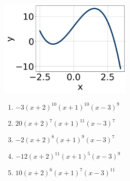 \documentclass[14pt]{extbook}
\begin{document}
\begin{enumerate}
{\begin{center}
    \includegraphics[width=0.5\textwidth]{../Figures/polyGraphToFunctionCopyA.png}
\end{center}
\begin{enumerate}[label=\Alph*.]
\item \( -3(x + 2)^{10} (x + 1)^{10} (x - 3)^{9} \)
\item \( 20(x + 2)^{7} (x + 1)^{11} (x - 3)^{7} \)
\item \( -2(x + 2)^{8} (x + 1)^{9} (x - 3)^{7} \)
\item \( -12(x + 2)^{11} (x + 1)^{5} (x - 3)^{9} \)
\item \( 10(x + 2)^{6} (x + 1)^{7} (x - 3)^{11} \)


\end{enumerate}}
\end{enumerate}
\end{document}
